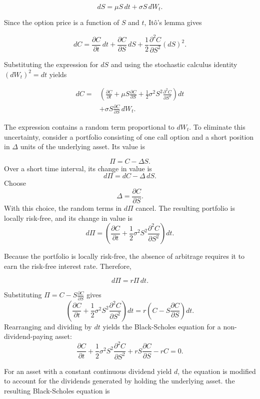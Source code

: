 \documentclass{article}
\begin{document}
	\[
	dS = \mu S\,dt +\sigma S\,dW_t.
	\]
	
	Since the option price is a function of $S$ and $t$, It\^o's lemma gives
	
	\[
	dC = \frac{\partial C}{\partial t}\,dt + \frac{\partial C}{\partial S}\,dS + \frac{1}{2}\frac{\partial^2 C}{\partial S^2}(dS)^2.
	\]
	
	Substituting the expression for $dS$ and using the stochastic calculus identity $(dW_t)^2=dt$ yields
	
	\[
	\begin{aligned}
		dC ={}&
		\left(
		\frac{\partial C}{\partial t}
		+\mu S\frac{\partial C}{\partial S}
		+\frac{1}{2}\sigma^2 S^2
		\frac{\partial^2 C}{\partial S^2}
		\right)dt\\
		&+\sigma S\frac{\partial C}{\partial S}\,dW_t.
	\end{aligned}
	\]
	
	The expression contains a random term proportional to $dW_t$. To eliminate this uncertainty, consider a portfolio consisting of one call option and a short position in $\Delta$ units of the underlying asset. Its value is
	
	\[
	\Pi=C-\Delta S.
	\]
	Over a short time interval, its change in value is
	\[
	d\Pi=dC-\Delta\,dS.
	\]
	Choose
	\[
	\Delta=\frac{\partial C}{\partial S}.
	\]
	With this choice, the random terms in $d\Pi$ cancel. The resulting portfolio is locally risk-free, and its change in value is
	\[
	d\Pi =
	\left(
	\frac{\partial C}{\partial t}
	+\frac{1}{2}\sigma^2S^2
	\frac{\partial^2 C}{\partial S^2}
	\right)dt.
	\]
	
	Because the portfolio is locally risk-free, the absence of arbitrage requires it to earn the risk-free interest rate. Therefore, 
	
	\[
	d\Pi=r\Pi\,dt.
	\]
	
	Substituting $\Pi=C-S\frac{\partial C}{\partial S}$ gives
	\[
	\left(
	\frac{\partial C}{\partial t}
	+\frac{1}{2}\sigma^2S^2
	\frac{\partial^2 C}{\partial S^2}
	\right)dt
	=
	r\left(
	C-S\frac{\partial C}{\partial S}
	\right)dt.
	\]
	Rearranging and dividing by $dt$ yields the Black-Scholes equation for a non-dividend-paying asset:
	\[
	\boxed{
		\frac{\partial C}{\partial t}
		+\frac{1}{2}\sigma^2S^2
		\frac{\partial^2 C}{\partial S^2}
		+rS\frac{\partial C}{\partial S}
		-rC=0.
	}
	\]
	
	For an asset with a constant continuous dividend yield $d$, the equation is modified to account for the dividends generated by holding the underlying asset. the resulting Black-Scholes equation is
	
\end{document}
